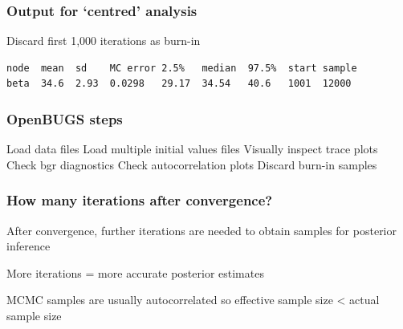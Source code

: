 \begin{frame}[fragile]
\frametitle{Output for \lq centred' analysis}
\begin{center}
\end{center}
Discard first 1,000 iterations as burn-in
\begin{footnotesize}
\begin{verbatim}
node  mean  sd    MC error 2.5%   median  97.5%  start sample
beta  34.6  2.93  0.0298   29.17  34.54   40.6   1001  12000
\end{verbatim}
\end{footnotesize}
\end{frame}

\begin{frame}
\frametitle{OpenBUGS steps}
 \bi
 \I Load data files\vspace{2mm}
 \I Load multiple initial values files\vspace{2mm}
 \I Visually inspect trace plots\vspace{2mm}
 \I Check bgr diagnostics\vspace{2mm}
 \I Check autocorrelation plots\vspace{2mm}
 \I Discard burn-in samples\vspace{2mm}
 \ei
\end{frame}


\begin{frame}
\frametitle{How many iterations after convergence?}
\bibig
\item After convergence, further iterations are needed to obtain samples for posterior inference\vspace{2mm}
\item More iterations = more accurate posterior estimates\vspace{2mm}
\item MCMC samples are usually \alert{autocorrelated} so effective sample size < actual sample size
\eibig
\end{frame}



